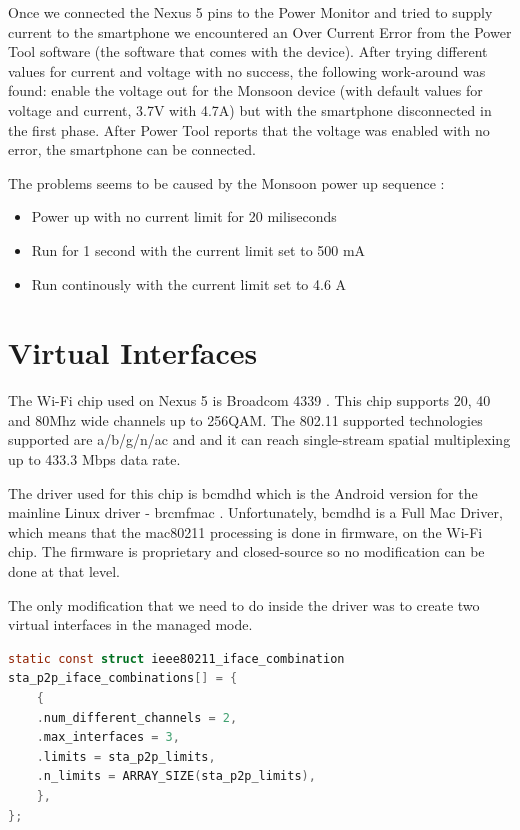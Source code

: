 Once we connected the Nexus 5 pins to the Power Monitor and tried to supply current to the smartphone we encountered an Over Current Error from the Power Tool software (the software that comes with the device). After trying different values for current and voltage with no success, the following work-around was found: enable the voltage out for the Monsoon device (with default values for voltage and current, 3.7V with 4.7A) but with the smartphone disconnected in the first phase. After Power Tool reports that the voltage was enabled with no error, the smartphone can be connected.


The problems seems to be caused by the Monsoon power up sequence \cite{cite-manualmonsoon}:
\begin{itemize}
  \item Power up with no current limit for 20 miliseconds
  \item Run for 1 second with the current limit set to 500 mA
  \item Run continously with the current limit set to 4.6 A
\end{itemize}

\section{Virtual Interfaces}
\label{sec:virtual-interfaces}

The Wi-Fi chip used on Nexus 5 is Broadcom 4339 \cite{cite-wifichip} \cite{cite-ifixit}. This chip supports 20, 40 and 80Mhz wide channels up to 256QAM. The 802.11 supported technologies supported are a/b/g/n/ac and and it can reach single-stream spatial multiplexing up to 433.3 Mbps data rate. 

The driver used for this chip is bcmdhd which is the Android version for the mainline Linux driver - brcmfmac \cite{cite-brcmfmac}. Unfortunately, bcmdhd is a Full Mac Driver, which means that the mac80211 processing is done in firmware, on the Wi-Fi chip. The firmware is proprietary and closed-source so no modification can be done at that level.

The only modification that we need to do inside the driver was to create two virtual interfaces in the managed mode. 

\begin{lstlisting}[language=C, frame=single, caption={Interface combinations for bcmdh driver},label=InterfaceCombinations]
static const struct ieee80211_iface_combination
sta_p2p_iface_combinations[] = {
	{
	.num_different_channels = 2,
	.max_interfaces = 3,
	.limits = sta_p2p_limits,
	.n_limits = ARRAY_SIZE(sta_p2p_limits),
	},
};
\end{lstlisting}

